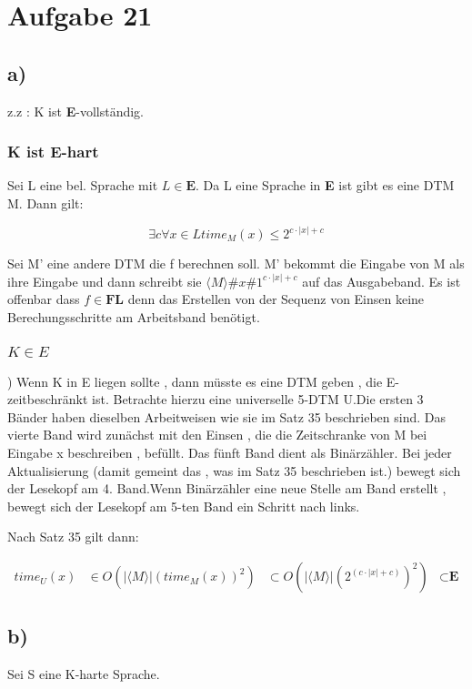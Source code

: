 \documentclass{article}
\begin{document}
	
	\section*{Aufgabe 21}
		\subsection*{a)}
			z.z : K ist \textbf{E}-vollständig.

			\subsubsection*{K ist E-hart}
				Sei L eine bel. Sprache mit $L \in \textbf{E}$. Da L eine Sprache in \textbf{E} ist gibt es eine DTM M. Dann gilt: 

					\[
						\exists c \forall x \in L time_M(x) \leq 2^{c \cdot |x| + c}
					\]

				Sei M' eine andere DTM die f berechnen soll. M' bekommt die Eingabe von M als ihre Eingabe und dann schreibt sie $\langle M \rangle \# x \# 1^{c \cdot |x| + c}$ auf das Ausgabeband. Es ist offenbar dass $f \in \textbf{FL}$ denn das Erstellen von der Sequenz von Einsen keine Berechungsschritte am Arbeitsband benötigt. 

			\subsubsection*{$K \in E$ })
				Wenn K in E liegen sollte , dann müsste es eine DTM geben , die E-zeitbeschränkt ist. 
				Betrachte hierzu eine universelle 5-DTM U.Die ersten 3 Bänder haben dieselben Arbeitweisen wie sie im Satz 35 beschrieben sind. Das vierte Band wird zunächst mit den Einsen  , die die Zeitschranke von M bei Eingabe x beschreiben , befüllt. Das fünft Band dient als Binärzähler. 
				Bei jeder Aktualisierung (damit gemeint das , was im Satz 35 beschrieben ist.) bewegt sich der Lesekopf am 4. Band.Wenn Binärzähler eine neue Stelle am Band erstellt , bewegt sich der Lesekopf am 5-ten Band ein Schritt nach links.

				Nach Satz 35 gilt dann:
				
				\begin{align*}
					time_U(x) &\in 
					O(| \langle M \rangle | (time_M(x))^2) &\subset
					O(| \langle M \rangle | (2^(c \cdot |x| + c))^2) &\subset
					\textbf{E}
				\end{align*} 

		\subsection*{b)}
			Sei S eine K-harte Sprache.
\end{document}
